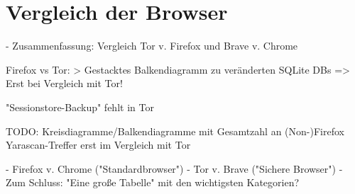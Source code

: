 \chapter{Vergleich der Browser}

- Zusammenfassung: Vergleich Tor v. Firefox und Brave v. Chrome

Firefox vs Tor:
	> Gestacktes Balkendiagramm zu veränderten SQLite DBs => Erst bei Vergleich mit Tor!
	
 "Sessionstore-Backup" fehlt in Tor

TODO: Kreisdiagramme/Balkendiagramme mit Gesamtzahl an (Non-)Firefox Yarascan-Treffer erst im Vergleich mit Tor

- Firefox v. Chrome ("Standardbrowser")
- Tor v. Brave ("Sichere Browser")
- Zum Schluss: "Eine große Tabelle" mit den wichtigsten Kategorien?